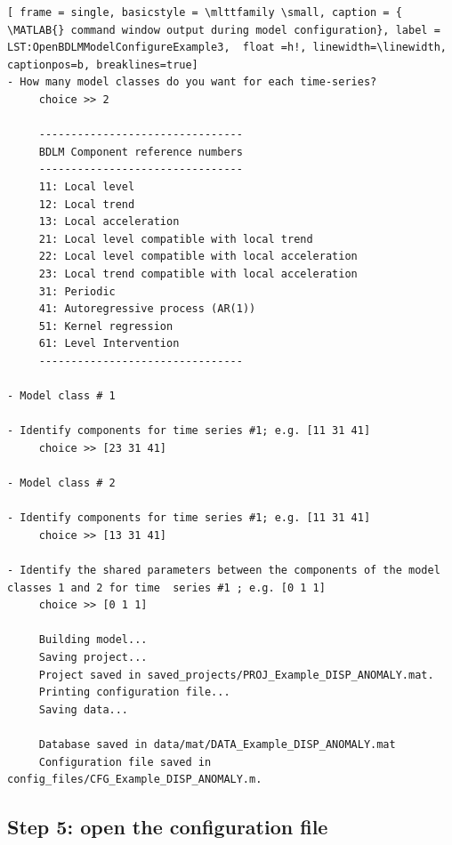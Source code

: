  \begin{lstlisting}[ frame = single, basicstyle = \mlttfamily \small, caption = { \MATLAB{} command window output during model configuration}, label = LST:OpenBDLMModelConfigureExample3,  float =h!, linewidth=\linewidth, captionpos=b, breaklines=true]
- How many model classes do you want for each time-series? 
     choice >> 2
     
     --------------------------------
     BDLM Component reference numbers
     --------------------------------
     11: Local level 
     12: Local trend 
     13: Local acceleration 
     21: Local level compatible with local trend 
     22: Local level compatible with local acceleration 
     23: Local trend compatible with local acceleration 
     31: Periodic 
     41: Autoregressive process (AR(1)) 
     51: Kernel regression 
     61: Level Intervention 
     --------------------------------

- Model class # 1 

- Identify components for time series #1; e.g. [11 31 41]
     choice >> [23 31 41]

- Model class # 2 

- Identify components for time series #1; e.g. [11 31 41]
     choice >> [13 31 41]

- Identify the shared parameters between the components of the model classes 1 and 2 for time  series #1 ; e.g. [0 1 1]
     choice >> [0 1 1]

     Building model...
     Saving project...
     Project saved in saved_projects/PROJ_Example_DISP_ANOMALY.mat. 
     Printing configuration file...
     Saving data...

     Database saved in data/mat/DATA_Example_DISP_ANOMALY.mat 
     Configuration file saved in config_files/CFG_Example_DISP_ANOMALY.m. 
\end{lstlisting}



\subsection{Step 5: open the configuration file}


